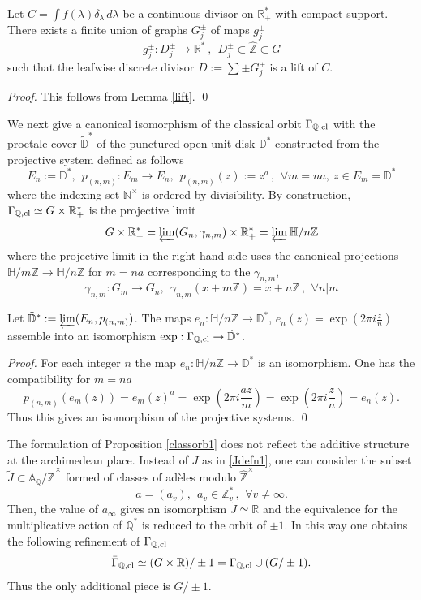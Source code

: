 \documentclass[graybox, envcountsect%
]{svmult}
\def\A{{\mathbb A}}
\def\D{{\mathbb D}}
\def\N{{\mathbb N}}
\def\Q{{\mathbb Q}}
\def\R{{\mathbb R}}
\def\Z{{\mathbb Z}}
\def\H{{\mathbb H}}
\def\hatz{{\hat\Z^\times}}
\def\qqq{\,,\,~\forall}
\def\nt{\N^{\times}}
\begin{document}
	\begin{theorem}\label{liftclass} 
	Let  $C=\int f(\lambda) \delta_\lambda\, d\lambda$ be a continuous divisor on $\R_+^*$ with compact support. There exists a finite union of graphs $G_j^\pm$  of maps $g_j^\pm$
	 \begin{equation}\label{liftedthm}
g_j^\pm: D_j^\pm\to \R_+^*, \ \  D_j^\pm\subset \hat \Z\subset G
\end{equation}	
such that the leafwise discrete divisor $D:=\sum \pm G_j^\pm$ is a lift of $C$.
\end{theorem}
	 \begin{proof} This follows from Lemma \ref{lift}. \qed\end{proof}
	
	We next give a canonical isomorphism of the classical orbit $\Gamma_{\Q,{\rm cl}}$ 
	with the proetale cover $\tilde \D^*$ of the punctured open unit disk $\D^*$ constructed from the projective system defined as follows
	$$
	E_n:=\D^*, \ \ p_{(n,m)}: E_m\to E_n, \ \  p_{(n,m)}(z):=z^a \qqq m=na, \ z\in E_m=\D^*
	$$
where the indexing set $\nt$ is ordered by divisibility.	 By construction, $\Gamma_{\Q,{\rm cl}}\simeq G\times \R_+^*$ is the projective limit
\begin{equation}\label{projgnlim1}
G\times \R_+^*=\varprojlim (G_n,\gamma_{n,m})\times \R_+^*= \varprojlim \H/n\Z 
  \end{equation}
  where the projective limit in the right hand side uses the canonical projections $\H/m\Z\to \H/n\Z$ for $m=na$ corresponding to the $\gamma_{n,m}$,
$$
\gamma_{n,m}:G_m\to G_n, \ \ \gamma_{n,m}(x+m\Z)=x+n\Z \qqq n\vert m
$$
		\begin{proposition}\label{proetcov} Let $\tilde \D^*:=\varprojlim (E_n,p_{(n,m)})$. 
		The maps $e_n:\H/n\Z\to \D^*$, 
		$
		e_n(z)= \exp(2 \pi i \frac zn)
		$
		assemble into an isomorphism  $\exp:\Gamma_{\Q,{\rm cl}}\to \tilde \D^*$.
	\end{proposition}
	 \begin{proof}  For each integer $n$ the map $e_n:\H/n\Z\to \D^*$ is an isomorphism. One has the compatibility for $m=na$ 
	 $$
	 p_{(n,m)}(e_m(z))=e_m(z)^a=\exp(2 \pi i \frac{a z}{m})
	 =\exp(2 \pi i \frac{z}{n})=e_n(z).
	 $$
	Thus this gives an isomorphism of the projective systems. \qed\end{proof}
	
	\begin{rem} \label{additivestruct} 
	The formulation of Proposition \ref{classorb1} does not reflect the additive structure at the archimedean place. 	Instead of $J$ as in \eqref{Jdefn1}, one can consider the subset $\tilde J\subset \A_\Q/\hatz$ formed of classes of ad\`eles  modulo $\hatz$
$$
a=(a_v), \ \ a_v\in \Z_v^*\qqq v\neq\infty.
$$
Then, the value of $a_\infty$ gives an isomorphism $\tilde J\simeq \R$ and the equivalence for the multiplicative action of $\Q^*$ is reduced to the orbit of $\pm 1$. In this way one obtains the following refinement of $\Gamma_{\Q,{\rm cl}}$
$$
\bar\Gamma_{\Q,{\rm cl}}\simeq (G\times \R)/\pm 1=\Gamma_{\Q,{\rm cl}} \cup (G/\pm 1).
$$
Thus the only additional piece is $G/\pm 1$.
	\end{rem}
	
\end{document}
